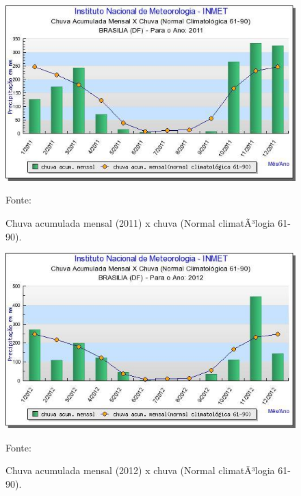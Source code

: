 \begin{figure}[H]
	 \centering
	\label{Chuva acumulada mensal (2011) x chuva (Normal climatÃ³logia 61-90)}
	 \includegraphics[scale=0.6]{captacao/1.jpg}
	 \caption{Chuva acumulada mensal (2011) x chuva (Normal climatÃ³logia 61-90).}
	 \small{Fonte: \cite{INMET}}
\end{figure}
 
 
\begin{figure}[H]
	 \centering
	\label{Chuva acumulada mensal (2012) x chuva (Normal climatÃ³logia 61-90)}
	 \includegraphics[scale=0.6]{captacao/2.jpg}
	 \caption{Chuva acumulada mensal (2012) x chuva (Normal climatÃ³logia 61-90).}
	\small{Fonte: \cite{INMET}}
\end{figure}

